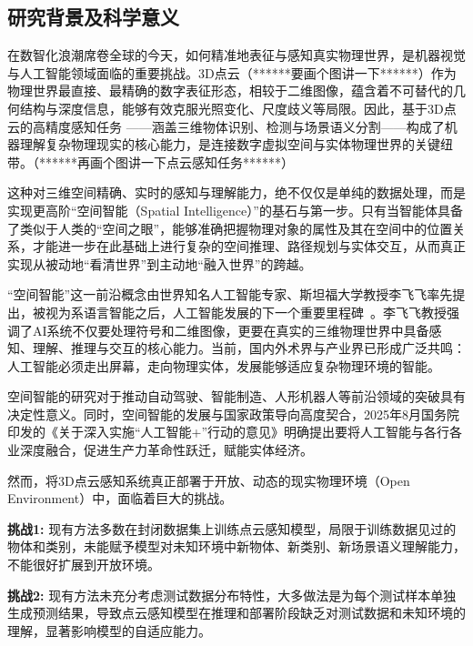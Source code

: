 \documentclass[12pt]{article}
\newcommand{\myEmph}[1]{\textbf{\textcolor[rgb]{0,0,0.25}{#1}}}
\begin{document}
\subsection{研究背景及科学意义}

在数智化浪潮席卷全球的今天，如何精准地表征与感知真实物理世界，是机器视觉与人工智能领域面临的重要挑战。3D点云（******要画个图讲一下******）作为物理世界最直接、最精确的数字表征形态，相较于二维图像，蕴含着不可替代的几何结构与深度信息，能够有效克服光照变化、尺度歧义等局限。因此，基于3D点云的高精度感知任务
——涵盖三维物体识别、检测与场景语义分割——构成了机器理解复杂物理现实的核心能力，是连接数字虚拟空间与实体物理世界的关键纽带。（******再画个图讲一下点云感知任务******）

这种对三维空间精确、实时的感知与理解能力，绝不仅仅是单纯的数据处理，而是实现更高阶“空间智能（Spatial Intelligence）”的基石与第一步。只有当智能体具备了类似于人类的“空间之眼”，能够准确把握物理对象的属性及其在空间中的位置关系，才能进一步在此基础上进行复杂的空间推理、路径规划与实体交互，从而真正实现从被动地“看清世界”到主动地“融入世界”的跨越。

“空间智能”这一前沿概念由世界知名人工智能专家、斯坦福大学教授李飞飞率先提出，被视为系语言智能之后，人工智能发展的下一个重要里程碑~\cite{li25spatialai}。李飞飞教授强调了AI系统不仅要处理符号和二维图像，更要在真实的三维物理世界中具备感知、理解、推理与交互的核心能力。当前，国内外术界与产业界已形成广泛共鸣：人工智能必须走出屏幕，走向物理实体，发展能够适应复杂物理环境的智能。

空间智能的研究对于推动自动驾驶、智能制造、人形机器人等前沿领域的突破具有决定性意义。同时，空间智能的发展与国家政策导向高度契合，2025年8月国务院印发的《关于深入实施“人工智能+”行动的意见》明确提出要将人工智能与各行各业深度融合，促进生产力革命性跃迁，赋能实体经济。

然而，将3D点云感知系统真正部署于开放、动态的现实物理环境（Open Environment）中，面临着巨大的挑战。

\myEmph{挑战1:} 现有方法多数在封闭数据集上训练点云感知模型，局限于训练数据见过的物体和类别，未能赋予模型对未知环境中新物体、新类别、新场景语义理解能力，不能很好扩展到开放环境。

\myEmph{挑战2:} 现有方法未充分考虑测试数据分布特性，大多做法是为每个测试样本单独生成预测结果，导致点云感知模型在推理和部署阶段缺乏对测试数据和未知环境的理解，显著影响模型的自适应能力。
\end{document}
